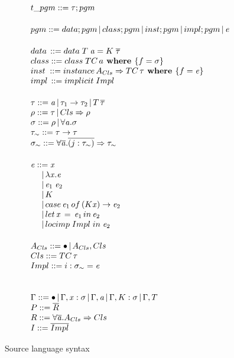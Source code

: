 \documentclass{article}
\begin{document}
\begin{figure}
  \[
\begin{array}{@{\hspace{0mm}}l@{\hspace{0mm}}}  
  t\_pgm ::= \type;pgm\\[5mm]
  pgm ::= data;pgm\,|\,class;pgm\,|\,inst;pgm\,|\,impl;pgm\,|\,\term
  \\[5mm]
 data\,::= data\;T\;\tyVar=K\;\overline{\type}\\
 class ::=class\; TC\,a\textbf{ where }\{f=\typeS\}\\
 inst\;::=instance\,A_{Cls}\Rightarrow TC \,\type\textbf{ where }\{f=\term\}\\
 impl\,::=implicit\; Impl
  \\[5mm]
  \type ::= \tyVar\,|\,\type_1\to\type_2\,|\,T\,\overline{\type}\\
  \qtype ::= \type\,|\,Cls \Rightarrow \qtype\\
  \typeS ::= \qtype\,|\,\forall\tyVar.\typeS\\
  \type_{\sim} ::= \type \to \type\\
  \typeS_{\sim} ::= \forall \overline {\tyVar} . \overline{(j : \type_{\sim})} \Rightarrow \type_{\sim}
 \\[5mm]

  \term ::= \tmVar\\
  \phantom{\term ::}|\,\lambda \tmVar.\term\\
  \phantom{\term ::}|\,\term_1 \; \term_2\\
  \phantom{\term ::}|\, K\\
  \phantom{\term ::}|\, case \, \term_1 \, of\, (K \tmVar) \rightarrow \term_2\\
  \phantom{\term ::}|\, let \, \tmVar \, =\, \term_1 \,in\, \term_2  \\
  \phantom{\term ::}|\, locimp \; Impl\; in\; \term_2

  \\[5mm]
  A_{Cls} ::= \bullet\,|\,A_{Cls},Cls\\
  Cls ::= TC\,\type\\
  Impl ::= i : \typeS_{\sim}=\term\\
  \\[5mm]
  \tyEnv::=\bullet\,|\,\tyEnv,\tmVar:\typeS\,|\,\tyEnv,\tyVar\,|\,\tyEnv,K:\typeS\,|\,\tyEnv,T\\
  \thEnv::=\overline{R}\\
  R ::= \forall\overline{\tyVar}.A_{Cls}\Rightarrow Cls\\
  \imEnv::=\overline{Impl}
  \end{array}
\]
  \caption{Source language syntax}
\end{figure}
\end{document}
